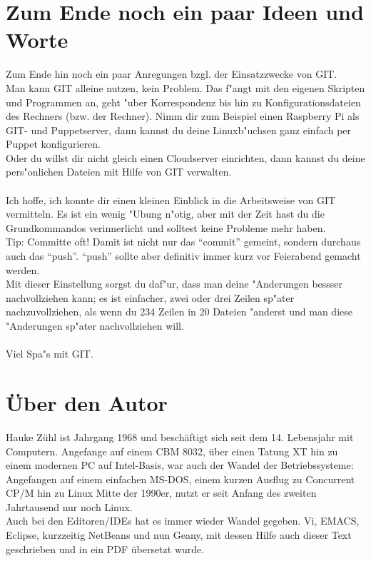 \documentclass[german,a4paper]{report}
\begin{document}
\chapter{Zum Ende noch ein paar Ideen und Worte}
Zum Ende hin noch ein paar Anregungen bzgl. der Einsatzzwecke
von GIT.\\
Man kann GIT alleine nutzen, kein Problem. Das f"angt mit den
eigenen Skripten und Programmen an, geht "uber Korrespondenz
bis hin zu Konfigurationsdateien des Rechners (bzw. der Rechner).
Nimm dir zum Beispiel einen Raspberry Pi als GIT- und Puppetserver,
dann kannst du deine Linuxb"uchsen ganz einfach per Puppet
konfigurieren.\\
Oder du willst dir nicht gleich einen Cloudserver einrichten, dann
kannst du deine pers"onlichen Dateien mit Hilfe von GIT verwalten.\\
\\
Ich hoffe, ich konnte dir einen kleinen Einblick in die Arbeitsweise
von GIT vermitteln. Es ist ein wenig "Ubung n"otig, aber mit der Zeit
hast du die Grundkommandos verinnerlicht und solltest keine Probleme
mehr haben.\\
Tip: Committe oft! Damit ist nicht nur das ``commit'' gemeint, sondern
durchaus auch das ``push''. ``push'' sollte aber definitiv immer kurz
vor Feierabend gemacht werden.\\
Mit dieser Einstellung sorgst du daf"ur, dass man deine "Anderungen
bessser nachvollziehen kann; es ist einfacher, zwei oder drei Zeilen
sp"ater nachzuvollziehen, als wenn du 234 Zeilen in 20 Dateien
"anderst und man diese "Anderungen sp"ater nachvollziehen will.\\
\\
Viel Spa"s mit GIT.

\chapter{Über den Autor}
Hauke Zühl ist Jahrgang 1968 und beschäftigt sich seit dem 14.
Lebensjahr mit Computern. Angefange auf einem CBM 8032, über
einen Tatung XT hin zu einem modernen PC auf Intel-Basis,
war auch der Wandel der Betriebssysteme:\\
Angefangen auf einem einfachen MS-DOS, einem kurzen Ausflug
zu Concurrent CP/M hin zu Linux Mitte der 1990er, nutzt er
seit Anfang des zweiten Jahrtausend nur noch Linux.\\
Auch bei den Editoren/IDEs hat es immer wieder Wandel gegeben.
Vi, EMACS, Eclipse, kurzzeitig NetBeans und nun Geany, mit
dessen Hilfe auch dieser Text geschrieben und in ein PDF
übersetzt wurde.
\end{document}
